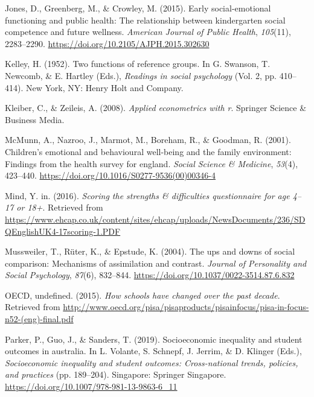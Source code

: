 \documentclass[
  english,
  man]{apa6}
\newlength{\cslhangindent}
\newenvironment{cslreferences}%
  {\setlength{\parindent}{0pt}%
  \everypar{\setlength{\hangindent}{\cslhangindent}}\ignorespaces}%
  {\par}
\begin{document}
\begin{cslreferences}
\leavevmode\hypertarget{ref-jones2015}{}%
Jones, D., Greenberg, M., \& Crowley, M. (2015). Early social-emotional functioning and public health: The relationship between kindergarten social competence and future wellness. \emph{American Journal of Public Health}, \emph{105}(11), 2283--2290. \url{https://doi.org/10.2105/AJPH.2015.302630}

\leavevmode\hypertarget{ref-kelley1952}{}%
Kelley, H. (1952). Two functions of reference groups. In G. Swanson, T. Newcomb, \& E. Hartley (Eds.), \emph{Readings in social psychology} (Vol. 2, pp. 410--414). New York, NY: Henry Holt and Company.

\leavevmode\hypertarget{ref-kleiber2008}{}%
Kleiber, C., \& Zeileis, A. (2008). \emph{Applied econometrics with r}. Springer Science \& Business Media.

\leavevmode\hypertarget{ref-mcmunn2001}{}%
McMunn, A., Nazroo, J., Marmot, M., Boreham, R., \& Goodman, R. (2001). Children's emotional and behavioural well-being and the family environment: Findings from the health survey for england. \emph{Social Science \& Medicine}, \emph{53}(4), 423--440. \url{https://doi.org/10.1016/S0277-9536(00)00346-4}

\leavevmode\hypertarget{ref-youth2016scoring}{}%
Mind, Y. in. (2016). \emph{Scoring the strengths \& difficulties questionnaire for age 4--17 or 18+}. Retrieved from \url{https://www.ehcap.co.uk/content/sites/ehcap/uploads/NewsDocuments/236/SDQEnglishUK4-17scoring-1.PDF}

\leavevmode\hypertarget{ref-mussweiler2004}{}%
Mussweiler, T., Rüter, K., \& Epstude, K. (2004). The ups and downs of social comparison: Mechanisms of assimilation and contrast. \emph{Journal of Personality and Social Psychology}, \emph{87}(6), 832--844. \url{https://doi.org/10.1037/0022-3514.87.6.832}

\leavevmode\hypertarget{ref-oecd2015}{}%
OECD, undefined. (2015). \emph{How schools have changed over the past decade}. Retrieved from \url{http://www.oecd.org/pisa/pisaproducts/pisainfocus/pisa-in-focus-n52-(eng)-final.pdf}

\leavevmode\hypertarget{ref-parker2019}{}%
Parker, P., Guo, J., \& Sanders, T. (2019). Socioeconomic inequality and student outcomes in australia. In L. Volante, S. Schnepf, J. Jerrim, \& D. Klinger (Eds.), \emph{Socioeconomic inequality and student outcomes: Cross-national trends, policies, and practices} (pp. 189--204). Singapore: Springer Singapore. \url{https://doi.org/10.1007/978-981-13-9863-6_11}


\end{cslreferences}
\end{document}
